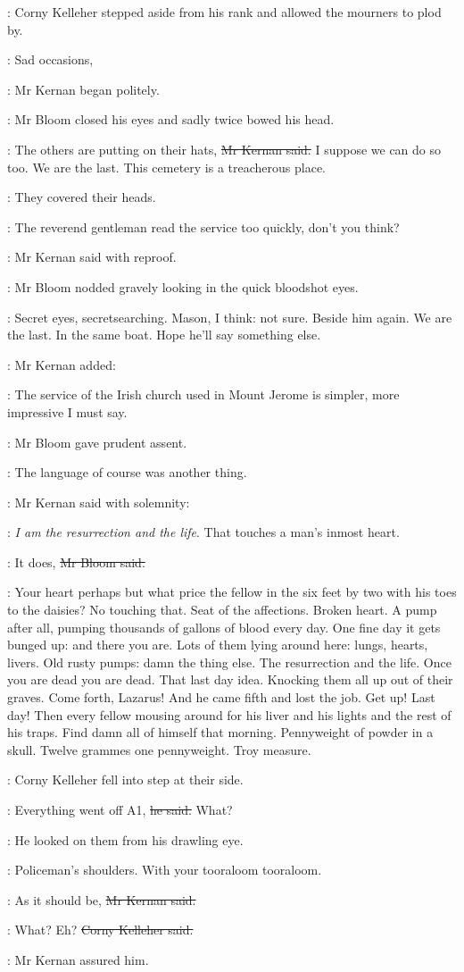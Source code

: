 :
Corny Kelleher stepped aside from his rank and allowed the mourners to plod by.

:
Sad occasions,

:
Mr Kernan began politely.

:
Mr Bloom closed his eyes and sadly twice bowed his head.

:
The others are putting on their hats,
\sout{Mr Kernan said.}
I suppose we can do so too.
We are the last.
This cemetery is a treacherous place.

:
They covered their heads.

:
The reverend gentleman read the service too quickly, don't you think?

:
Mr Kernan said with reproof.

:
Mr Bloom nodded gravely looking in the quick bloodshot eyes.

\BloomInt:
Secret eyes, secretsearching.
Mason, I think:
not sure.
Beside him again.
We are the last.
In the same boat.
Hope he'll say something else.

:
Mr Kernan added:

:
The service of the Irish church used in Mount Jerome is simpler,
more impressive I must say.

:
Mr Bloom gave prudent assent.

\BloomInt:
The language of course was another thing.

:
Mr Kernan said with solemnity:

:
\emph{I am the resurrection and the life}.
That touches a man's inmost heart.

\Bloom:
It does,
\sout{Mr Bloom said.}

\BloomInt:
Your heart perhaps but what price the fellow
in the six feet by two
with his toes to the daisies?
No touching that.
Seat of the affections.
Broken heart.
A pump after all, pumping thousands of gallons of blood every day.
One fine day it gets bunged up:
and there you are.
Lots of them lying around here:
lungs, hearts, livers.
Old rusty pumps:
damn the thing else.
The resurrection and the life.
Once you are dead you are dead.
That last day idea.
Knocking them all up out of their graves.
Come forth, Lazarus!
And he came fifth and lost the job.
Get up!
Last day!
Then every fellow mousing around for his liver and his lights
and the rest of his traps.
Find damn all of himself that morning.
Pennyweight of powder in a skull.
Twelve grammes one pennyweight.
Troy measure.

:
Corny Kelleher fell into step at their side.

\corny:
Everything went off A1,
\sout{he said.}
What?

:
He looked on them from his drawling eye.

\BloomInt:
Policeman's shoulders.
With your tooraloom tooraloom.

:
As it should be,
\sout{Mr Kernan said.}

\corny:
What?
Eh?
\sout{Corny Kelleher said.}

:
Mr Kernan assured him.
